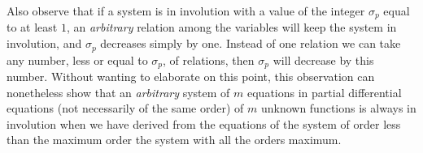\documentclass[leqno,11pt]{book}
\theoremstyle{shape1}
\theoremstyle{shapesmall}
\begin{document}
Also observe that if a system is in involution with a value of the integer $\sigma_{p}$ equal to at least $1$, an \emph{arbitrary} relation among the variables will keep the system in involution, and $\sigma_{p}$ decreases simply by one. Instead of one relation we can take any number, less or equal to $\sigma_{p}$, of relations, then $\sigma_{p}$ will decrease by this number. Without wanting to elaborate on this point, this observation can nonetheless show that an \emph{arbitrary} system of $m$ equations in partial differential equations (not necessarily of the same order) of $m$ unknown functions is always in involution when we have derived from the equations of the system of order less than the maximum order the system with all the orders maximum.
\end{document}

